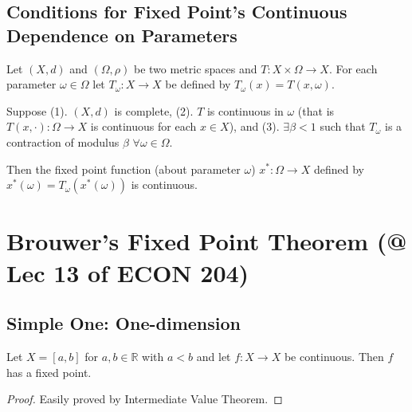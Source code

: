 \documentclass[11pt]{elegantbook}
\begin{document}
\subsection{Conditions for Fixed Point's Continuous Dependence on Parameters}
\begin{theorem}
    Let $(X, d)$ and $(\Omega, \rho)$ be two metric spaces and $T : X \times \Omega \rightarrow X$. For each parameter $\omega \in \Omega$ let $T_\omega : X \rightarrow X$ be defined by $T_\omega(x)=T(x,\omega)$.

    Suppose (1). $(X, d)$ is complete, (2). $T$ is continuous in $\omega$ (that is $T(x, \cdot) : \Omega \rightarrow X$ is continuous for each $x \in X$), and (3). $\exists \beta < 1$ such that $T_\omega$ is a contraction of modulus $\beta$ $\forall \omega \in \Omega$.
    
    Then the fixed point function (about parameter $\omega$) $x^*: \Omega \rightarrow X$ defined by $x^*(\omega)=T_\omega(x^*(\omega))$ is continuous.
\end{theorem}

\section{Brouwer's Fixed Point Theorem \small{(@ Lec 13 of ECON 204)}}
\subsection{Simple One: One-dimension}
\begin{theorem}
    Let $X = [a, b]$ for $a, b \in \mathbb{R}$ with $a < b$ and let $f : X \rightarrow X$ be continuous. Then $f$ has a fixed point.
\end{theorem}
\begin{proof}
    Easily proved by Intermediate Value Theorem.
\end{proof}
\end{document}
